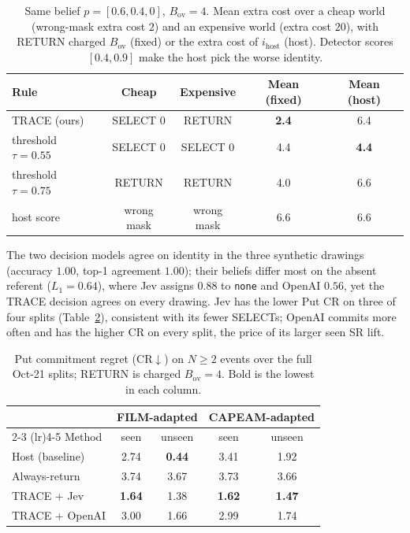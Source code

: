 \documentclass[conference]{IEEEtran}
\begin{document}
\begin{table}[!t]
\centering
\caption{Same belief $p{=}[0.6,0.4,0]$, $B_{\mathrm{ov}}{=}4$. Mean extra cost over a cheap world (wrong-mask extra cost $2$) and an expensive world (extra cost $20$), with RETURN charged $B_{\mathrm{ov}}$ (fixed) or the extra cost of $i_{\mathrm{host}}$ (host). Detector scores $[0.4,0.9]$ make the host pick the worse identity.}
\label{tab:rules}
\scriptsize
\setlength{\tabcolsep}{3.5pt}
\begin{tabular}{lcccc}
\toprule
Rule & Cheap & Expensive & Mean (fixed) & Mean (host) \\
\midrule
TRACE (ours) & SELECT $0$ & RETURN & \textbf{2.4} & 6.4 \\
threshold $\tau{=}0.55$ & SELECT $0$ & SELECT $0$ & 4.4 & \textbf{4.4} \\
threshold $\tau{=}0.75$ & RETURN & RETURN & 4.0 & 6.6 \\
host score & wrong mask & wrong mask & 6.6 & 6.6 \\
\bottomrule
\end{tabular}
\end{table}

The two decision models agree on identity in the three synthetic drawings (accuracy $1.00$, top-1 agreement $1.00$); their beliefs differ most on the absent referent ($L_1{=}0.64$), where Jev assigns $0.88$ to \texttt{none} and OpenAI $0.56$, yet the TRACE decision agrees on every drawing.
Jev has the lower Put CR on three of four splits (Table~\ref{tab:putcr}), consistent with its fewer SELECTs; OpenAI commits more often and has the higher CR on every split, the price of its larger seen SR lift. %

\begin{table}[!t]
\centering
\caption{Put commitment regret (CR$\downarrow$) on $N\ge 2$ events over the full Oct-21 splits; RETURN is charged $B_{\mathrm{ov}}{=}4$. Bold is the lowest in each column.}
\label{tab:putcr}
\scriptsize
\setlength{\tabcolsep}{4pt}
\begin{tabular}{lcccc}
\toprule
& \multicolumn{2}{c}{FILM-adapted} & \multicolumn{2}{c}{CAPEAM-adapted} \\
\cmidrule(lr){2-3} \cmidrule(lr){4-5}
Method & seen & unseen & seen & unseen \\
\midrule
Host (baseline) & 2.74 & \textbf{0.44} & 3.41 & 1.92 \\
Always-return & 3.74 & 3.67 & 3.73 & 3.66 \\
TRACE + Jev & \textbf{1.64} & 1.38 & \textbf{1.62} & \textbf{1.47} \\
TRACE + OpenAI & 3.00 & 1.66 & 2.99 & 1.74 \\
\bottomrule
\end{tabular}
\end{table}
\end{document}
